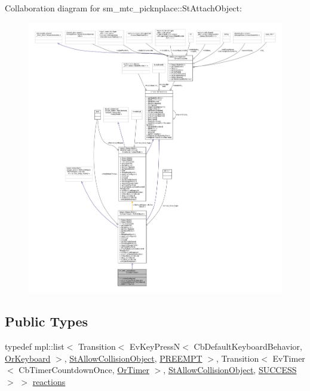 Collaboration diagram for sm\+\_\+mtc\+\_\+picknplace\+:\+:St\+Attach\+Object\+:
\nopagebreak
\begin{figure}[H]
\begin{center}
\leavevmode
\includegraphics[width=350pt]{structsm__mtc__picknplace_1_1StAttachObject__coll__graph}
\end{center}
\end{figure}
\subsection*{Public Types}
\begin{DoxyCompactItemize}
\item 
typedef mpl\+::list$<$ Transition$<$ Ev\+Key\+PressN$<$ Cb\+Default\+Keyboard\+Behavior, \hyperlink{classsm__mtc__picknplace_1_1OrKeyboard}{Or\+Keyboard} $>$, \hyperlink{structsm__mtc__picknplace_1_1StAllowCollisionObject}{St\+Allow\+Collision\+Object}, \hyperlink{classPREEMPT}{P\+R\+E\+E\+M\+PT} $>$, Transition$<$ Ev\+Timer$<$ Cb\+Timer\+Countdown\+Once, \hyperlink{classsm__mtc__picknplace_1_1OrTimer}{Or\+Timer} $>$, \hyperlink{structsm__mtc__picknplace_1_1StAllowCollisionObject}{St\+Allow\+Collision\+Object}, \hyperlink{classSUCCESS}{S\+U\+C\+C\+E\+SS} $>$ $>$ \hyperlink{structsm__mtc__picknplace_1_1StAttachObject_a7ea0cc91807fb4b6d699953de36aef53}{reactions}
\end{DoxyCompactItemize}
